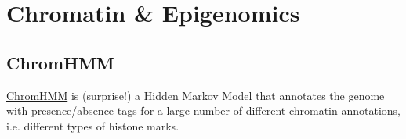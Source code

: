\section{Chromatin \& Epigenomics}
\subsection{ChromHMM}
\hyperlink{https://www.nature.com/articles/nmeth.1906}{ChromHMM} is (surprise!) a Hidden Markov Model that annotates the genome with presence/absence tags for a large number of different chromatin annotations, i.e. different types of histone marks.
